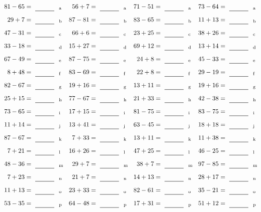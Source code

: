 \documentclass
[
  draft    = true,
  fontsize = 11pt,
  parskip  = half-
]
{scrartcl}
\begin{document}
\clearpage
\begin{align*}
    \pline{81-65}&=\rline{a}
  & \pline{56+7}&=\rline{a}
  & \pline{71-51}&=\rline{a}
  & \pline{73-64}&=\rline{a} \\[1ex]
    \pline{29+7}&=\rline{b}
  & \pline{87-81}&=\rline{b}
  & \pline{83-65}&=\rline{b}
  & \pline{11+13}&=\rline{b} \\[1ex]
    \pline{47-31}&=\rline{c}
  & \pline{66+6}&=\rline{c}
  & \pline{23+25}&=\rline{c}
  & \pline{38+26}&=\rline{c} \\[1ex]
    \pline{33-18}&=\rline{d}
  & \pline{15+27}&=\rline{d}
  & \pline{69+12}&=\rline{d}
  & \pline{13+14}&=\rline{d} \\[1ex]
    \pline{67-49}&=\rline{e}
  & \pline{87-75}&=\rline{e}
  & \pline{24+8}&=\rline{e}
  & \pline{45-33}&=\rline{e} \\[1ex]
    \pline{8+48}&=\rline{f}
  & \pline{83-69}&=\rline{f}
  & \pline{22+8}&=\rline{f}
  & \pline{29-19}&=\rline{f} \\[1ex]
    \pline{82-67}&=\rline{g}
  & \pline{19+16}&=\rline{g}
  & \pline{13+11}&=\rline{g}
  & \pline{19+16}&=\rline{g} \\[1ex]
    \pline{25+15}&=\rline{h}
  & \pline{77-67}&=\rline{h}
  & \pline{21+33}&=\rline{h}
  & \pline{42-38}&=\rline{h} \\[1ex]
    \pline{73-65}&=\rline{i}
  & \pline{17+15}&=\rline{i}
  & \pline{81-75}&=\rline{i}
  & \pline{83-75}&=\rline{i} \\[1ex]
    \pline{11+14}&=\rline{j}
  & \pline{13+41}&=\rline{j}
  & \pline{63-45}&=\rline{j}
  & \pline{18+18}&=\rline{j} \\[1ex]
    \pline{87-67}&=\rline{k}
  & \pline{7+33}&=\rline{k}
  & \pline{13+11}&=\rline{k}
  & \pline{11+38}&=\rline{k} \\[1ex]
    \pline{7+21}&=\rline{l}
  & \pline{16+26}&=\rline{l}
  & \pline{47+25}&=\rline{l}
  & \pline{46-25}&=\rline{l} \\[1ex]
    \pline{48-36}&=\rline{m}
  & \pline{29+7}&=\rline{m}
  & \pline{38+7}&=\rline{m}
  & \pline{97-85}&=\rline{m} \\[1ex]
    \pline{7+23}&=\rline{n}
  & \pline{21+7}&=\rline{n}
  & \pline{14+13}&=\rline{n}
  & \pline{28+17}&=\rline{n} \\[1ex]
    \pline{11+13}&=\rline{o}
  & \pline{23+33}&=\rline{o}
  & \pline{82-61}&=\rline{o}
  & \pline{35-21}&=\rline{o} \\[1ex]
    \pline{53-35}&=\rline{p}
  & \pline{64-48}&=\rline{p}
  & \pline{17+31}&=\rline{p}
  & \pline{51+12}&=\rline{p}
\end{align*}
\end{document}

